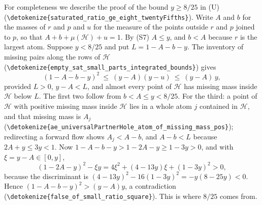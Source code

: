 \documentclass[10pt]{article}
\theoremstyle{definition}
\theoremstyle{remark}
\numberwithin{equation}{section}
\newcommand{\Hole}{\mathcal{H}}
\newcommand{\leanid}[1]{\expandafter\nolinkurl\expandafter{\detokenize{#1}}}
\newcommand{\Fm}[1]{\cite[#1]{Formalization}}
\begin{document}
For completeness we describe the proof of the bound $y\ge8/25$ in (U)~\Fm{\S10.2} (\leanid{saturated_ratio_ge_eight_twentyFifths}). Write $A$ and $b$ for the masses of $r$ and $p$ and $u$ for the measure of the points outside $r$ and $p$ joined to $p$, so that $A+b+\mu(\Hole)+u=1$. By (S7) $A\le y$, and $b<A$ because $r$ is the largest atom. Suppose $y<8/25$ and put $L=1-A-b-y$. The inventory of missing pairs along the rows of $\Hole$~\Fm{\S10.0} (\leanid{empty_sat_small_parts_integrated_bounds}) gives
\[
 (1-A-b-y)^2\ \le\ (y-A)(y-u)\ \le\ (y-A)\,y ,
\]
provided $L>0$, $y-A<L$, and almost every point of $\Hole$ has missing mass inside $\Hole$ below $L$. The first two follow from $b<A\le y<8/25$. For the third: a point of $\Hole$ with positive missing mass inside $\Hole$ lies in a whole atom $j$ contained in $\Hole$, and that missing mass is $A_j$ (\leanid{ae_universalPartnerHole_atom_of_missing_mass_pos}); redirecting a forward flow shows $A_j<A-b$, and $A-b<L$ because $2A+y\le3y<1$. Now $1-A-b-y>1-2A-y\ge1-3y>0$, and with $\xi=y-A\in[0,y]$,
\[
 (1-2A-y)^2-\xi y=4\xi^2+(4-13y)\xi+(1-3y)^2>0,
\]
because the discriminant is $(4-13y)^2-16(1-3y)^2=-y(8-25y)<0$. Hence $(1-A-b-y)^2>(y-A)y$, a contradiction (\leanid{false_of_small_ratio_square}). This is where $8/25$ comes from.
\end{document}

